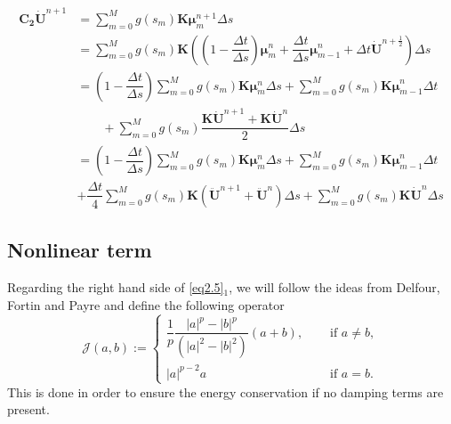 \documentclass[12pt]{article}
\numberwithin{equation}{section}
\begin{document}
\begin{align} 
\boldsymbol{C_2}\boldsymbol{\dot{U}}^{n+1}&= \sum\limits_{m=0}^M g(s_m) \boldsymbol{K} \boldsymbol{\mu}_m^{n+1} \Delta s \nonumber \\
&= \sum\limits_{m=0}^M g(s_m) \boldsymbol{K}\left( \left(1-\dfrac{\Delta t}{\Delta s} \right) \boldsymbol{\mu}_m^{n} + \dfrac{\Delta t}{\Delta s}\boldsymbol{\mu}_{m-1}^{n}  + \Delta t \boldsymbol{\dot{U}}^{n+\frac12}\right)\Delta s \nonumber \\
&= \left(1-\dfrac{\Delta t}{\Delta s} \right)\sum\limits_{m=0}^M g(s_m) \boldsymbol{K}  \boldsymbol{\mu}_m^{n} \Delta s
+ \sum\limits_{m=0}^M g(s_m)\boldsymbol{K\mu}_{m-1}^{n}\Delta t  \nonumber \\
&\qquad+ \sum\limits_{m=0}^M g(s_m)\dfrac{\boldsymbol{K\dot{U}}^{n+1}+ \boldsymbol{K\dot{U}}^{n}}{2} \Delta s \nonumber \\
&= \left(1-\dfrac{\Delta t}{\Delta s} \right)\sum\limits_{m=0}^M g(s_m) \boldsymbol{K}  \boldsymbol{\mu}_m^{n} \Delta s + \sum\limits_{m=0}^M g(s_m)\boldsymbol{K\mu}_{m-1}^{n}\Delta t  \nonumber \\
&+ \dfrac{\Delta t}{4} \sum\limits_{m=0}^M g(s_m) \boldsymbol{K}\left(\boldsymbol{\ddot{U}}^{n+1}+\boldsymbol{\ddot{U}}^n\right) \Delta s + \sum\limits_{m=0}^M g(s_m) \boldsymbol{K \dot{U}}^n \Delta s \label{C2}
\end{align}
\subsection{Nonlinear term}
Regarding the right hand side of \eqref{eq2.5}$_1$, we will follow the ideas from Delfour, Fortin and Payre \cite{delfour} and define the following operator
\begin{equation}\label{fun_J}
\mathcal{J}(a,b):= \begin{cases} \dfrac1{p}\dfrac{|a|^{p}-|b|^{p} }{(|a|^2-|b|^2)}(a+b),\quad &\text{ if } a\neq b, \\ |a|^{p-2}a & \text{ if } a = b. \end{cases}
\end{equation}
This is done in order to ensure the energy conservation if no damping terms are present. 
\end{document}
